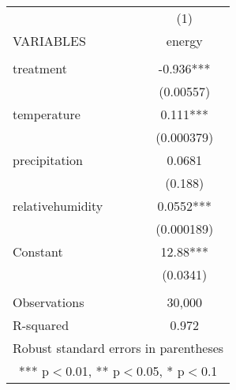 \documentclass[]{article}
\begin{document}
\begin{tabular}{lc} \hline
 & (1) \\
VARIABLES & energy \\ \hline
 &  \\
treatment & -0.936*** \\
 & (0.00557) \\
temperature & 0.111*** \\
 & (0.000379) \\
precipitation & 0.0681 \\
 & (0.188) \\
relativehumidity & 0.0552*** \\
 & (0.000189) \\
Constant & 12.88*** \\
 & (0.0341) \\
 &  \\
Observations & 30,000 \\
 R-squared & 0.972 \\ \hline
\multicolumn{2}{c}{ Robust standard errors in parentheses} \\
\multicolumn{2}{c}{ *** p$<$0.01, ** p$<$0.05, * p$<$0.1} \\
\end{tabular}
\end{document}
